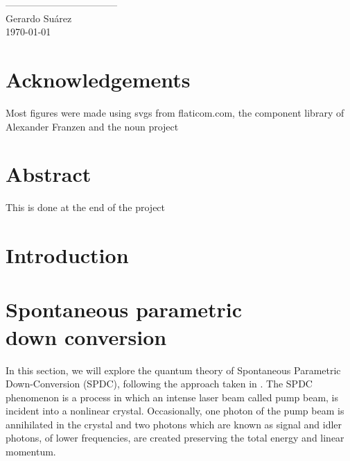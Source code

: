 \documentclass{book}
\newcommand\blankpage{
    \null
    \thispagestyle{empty}
    \addtocounter{page}{-1}
    \newpage
    }
\begin{document}
\vspace{2cm}
\begin{flushright}
-----------------------------------\\
Gerardo Suárez\\
\today
\end{flushright}
\pagebreak

\listoffigures\newpage
{}
\listoftables\newpage
\blankpage{}
\chapter*{Acknowledgements}
Most figures were made using svgs from flaticom.com, the component library of Alexander Franzen and the noun project

\pagebreak



\blankpage{}

\chapter*{Abstract}
This is done at the end of the project


\pagebreak


\blankpage{}

\chapter*{Introduction}


\blankpage{}


\chapter{Spontaneous parametric \\ down conversion}

In this section, we will explore the quantum theory of Spontaneous Parametric Down-Conversion (SPDC), following the approach taken in \cite{procopio,multiphoton}. The SPDC phenomenon is a process in which an intense laser beam called pump beam, is incident into a nonlinear crystal. Occasionally, one photon of the pump beam is annihilated in the crystal and two photons which are known as signal and idler photons, of lower frequencies, are created preserving the total energy and linear momentum.
\end{document}
